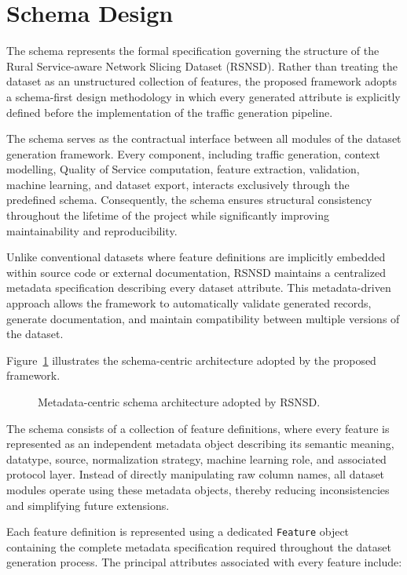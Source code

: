 \documentclass[12pt,a4paper]{article}
\begin{document}
\section{Schema Design}

The schema represents the formal specification governing the structure of the Rural Service-aware Network Slicing Dataset (RSNSD). Rather than treating the dataset as an unstructured collection of features, the proposed framework adopts a schema-first design methodology in which every generated attribute is explicitly defined before the implementation of the traffic generation pipeline.

The schema serves as the contractual interface between all modules of the dataset generation framework. Every component, including traffic generation, context modelling, Quality of Service computation, feature extraction, validation, machine learning, and dataset export, interacts exclusively through the predefined schema. Consequently, the schema ensures structural consistency throughout the lifetime of the project while significantly improving maintainability and reproducibility.

Unlike conventional datasets where feature definitions are implicitly embedded within source code or external documentation, RSNSD maintains a centralized metadata specification describing every dataset attribute. This metadata-driven approach allows the framework to automatically validate generated records, generate documentation, and maintain compatibility between multiple versions of the dataset.

Figure~\ref{fig:schema_architecture} illustrates the schema-centric architecture adopted by the proposed framework.

\begin{figure}[H]
	\centering
	\caption{Metadata-centric schema architecture adopted by RSNSD.}
	\label{fig:schema_architecture}
\end{figure}

The schema consists of a collection of feature definitions, where every feature is represented as an independent metadata object describing its semantic meaning, datatype, source, normalization strategy, machine learning role, and associated protocol layer. Instead of directly manipulating raw column names, all dataset modules operate using these metadata objects, thereby reducing inconsistencies and simplifying future extensions.

Each feature definition is represented using a dedicated \texttt{Feature} object containing the complete metadata specification required throughout the dataset generation process. The principal attributes associated with every feature include:
\end{document}
